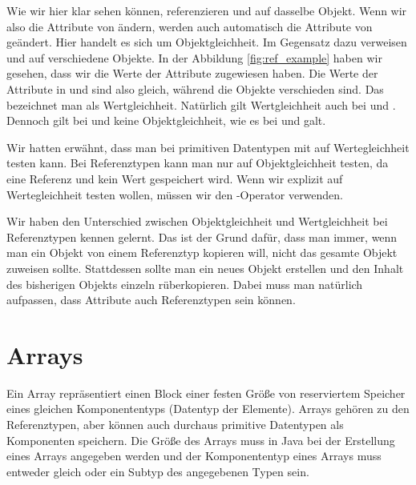 \documentclass{tuda-pub}
\begin{document}
  Wie wir hier klar sehen können, referenzieren  und  auf dasselbe
  Objekt. Wenn wir also die Attribute von  ändern, werden auch automatisch die
  Attribute von  geändert. Hier handelt es sich um Objektgleichheit. Im Gegensatz
  dazu verweisen  und  auf verschiedene Objekte. In der Abbildung
  \ref{fig:ref_example} haben wir gesehen, dass wir die Werte der Attribute zugewiesen haben. Die
  Werte der Attribute in  und  sind also gleich, während die Objekte
  verschieden sind. Das bezeichnet man als Wertgleichheit. Natürlich gilt Wertgleichheit auch bei
   und . Dennoch gilt bei  und  keine
  Objektgleichheit, wie es bei  und  galt.

  \br

  Wir hatten erwähnt, dass man bei primitiven Datentypen mit \inlinejava{==} auf Wertegleichheit
  testen kann. Bei Referenztypen kann man \inlinejava{==} nur auf Objektgleichheit testen, da
  eine Referenz und kein Wert gespeichert wird. Wenn wir explizit auf Wertegleichheit testen
  wollen, müssen wir den -Operator verwenden.

  \begin{note}[title=Information:]
    Wir haben den Unterschied zwischen Objektgleichheit und Wertgleichheit bei Referenztypen
    kennen gelernt. Das ist der Grund dafür, dass man immer, wenn man ein Objekt von einem
    Referenztyp kopieren will, nicht das gesamte Objekt zuweisen sollte. Stattdessen sollte man
    ein neues Objekt erstellen und den Inhalt des bisherigen Objekts einzeln rüberkopieren. Dabei
    muss man natürlich aufpassen, dass Attribute auch Referenztypen sein können.
  \end{note}

  \clearpage


  \section{Arrays}
  \label{sec:Arrays}
  Ein Array repräsentiert einen Block einer festen Größe von reserviertem Speicher eines gleichen
  Komponententyps (Datentyp der Elemente). Arrays gehören zu den Referenztypen, aber können auch
  durchaus primitive Datentypen als Komponenten speichern. Die Größe des Arrays muss in Java bei
  der Erstellung eines Arrays angegeben werden und der Komponententyp eines Arrays muss entweder
  gleich oder ein Subtyp des angegebenen Typen sein.
\end{document}
